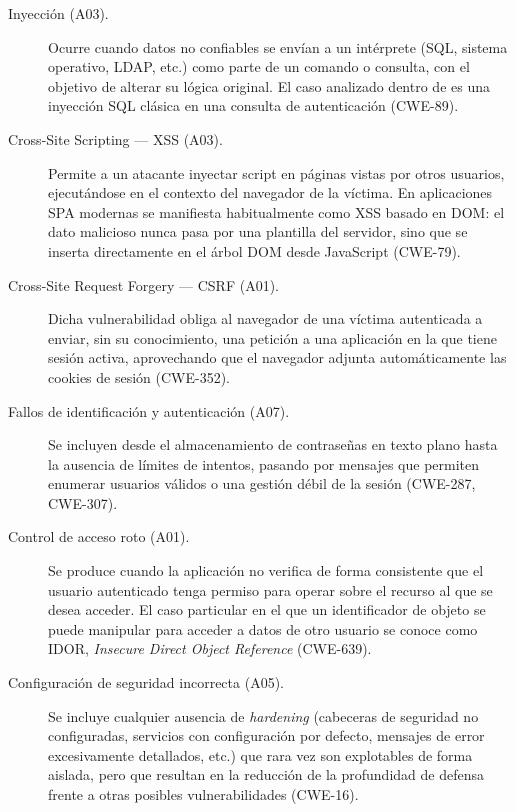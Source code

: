 \begin{description}
\item[Inyección (A03).] Ocurre cuando datos no confiables se envían a
  un intérprete (SQL, sistema operativo, LDAP, etc.) como parte de un
  comando o consulta, con el objetivo de alterar su lógica original. El caso
  analizado dentro de \breachlab es una inyección SQL clásica en una consulta 
  de autenticación (CWE-89).

\item[Cross-Site Scripting — XSS (A03).] Permite a un atacante inyectar
  script en páginas vistas por otros usuarios, ejecutándose en el contexto
  del navegador de la víctima. En aplicaciones SPA modernas se manifiesta
  habitualmente como XSS basado en DOM: el dato malicioso nunca pasa por una
  plantilla del servidor, sino que se inserta directamente en el árbol DOM
  desde JavaScript (CWE-79).

\item[Cross-Site Request Forgery — CSRF (A01).] Dicha vulnerabilidad obliga 
  al navegador de una víctima autenticada a enviar, sin su conocimiento, una 
  petición a una aplicación en la que tiene sesión activa, aprovechando que el 
  navegador adjunta automáticamente las cookies de sesión (CWE-352).

\item[Fallos de identificación y autenticación (A07).] Se incluyen desde el
  almacenamiento de contraseñas en texto plano hasta
  la ausencia de límites de intentos, pasando por mensajes que permiten enumerar
  usuarios válidos o una gestión débil de la sesión (CWE-287, CWE-307).

\item[Control de acceso roto (A01).] Se produce cuando la aplicación no
  verifica de forma consistente que el usuario autenticado tenga permiso
  para operar sobre el recurso al que se desea acceder. El caso particular en el que un
  identificador de objeto se puede manipular para acceder a datos de otro
  usuario se conoce como IDOR, \emph{Insecure Direct Object Reference}
  (CWE-639).

\item[Configuración de seguridad incorrecta (A05).] Se incluye cualquier ausencia de
  \emph{hardening} (cabeceras de seguridad no configuradas, servicios con
  configuración por defecto, mensajes de error excesivamente detallados,
  etc.) que rara vez son explotables de forma aislada, pero que resultan en
  la reducción de la profundidad de defensa frente a otras posibles 
  vulnerabilidades (CWE-16).
\end{description}

